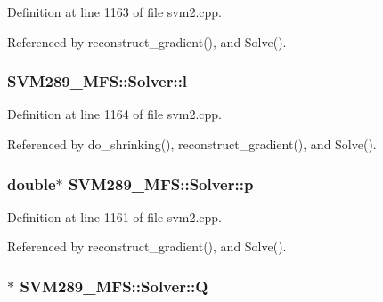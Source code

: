 Definition at line 1163 of file svm2.\+cpp.



Referenced by reconstruct\+\_\+gradient(), and Solve().

\subsubsection[{\texorpdfstring{l}{l}}]{ S\+V\+M289\+\_\+\+M\+F\+S\+::\+Solver\+::l\hspace{0.3cm}{\ttfamily [protected]}}\hypertarget{class_s_v_m289___m_f_s_1_1_solver_a3b58f02675a93b7f559946c731beebd5}{}\label{class_s_v_m289___m_f_s_1_1_solver_a3b58f02675a93b7f559946c731beebd5}


Definition at line 1164 of file svm2.\+cpp.



Referenced by do\+\_\+shrinking(), reconstruct\+\_\+gradient(), and Solve().

\subsubsection[{\texorpdfstring{p}{p}}]{\setlength{\rightskip}{0pt plus 5cm}double$\ast$ S\+V\+M289\+\_\+\+M\+F\+S\+::\+Solver\+::p\hspace{0.3cm}{\ttfamily [protected]}}\hypertarget{class_s_v_m289___m_f_s_1_1_solver_aee0ff21847e331b59d7a929b3c813b94}{}\label{class_s_v_m289___m_f_s_1_1_solver_aee0ff21847e331b59d7a929b3c813b94}


Definition at line 1161 of file svm2.\+cpp.



Referenced by reconstruct\+\_\+gradient(), and Solve().

\subsubsection[{\texorpdfstring{Q}{Q}}]{$\ast$ S\+V\+M289\+\_\+\+M\+F\+S\+::\+Solver\+::Q\hspace{0.3cm}{\ttfamily [protected]}}\hypertarget{class_s_v_m289___m_f_s_1_1_solver_a5655aaf1c92b609e8ed2087e08b053eb}{}\label{class_s_v_m289___m_f_s_1_1_solver_a5655aaf1c92b609e8ed2087e08b053eb}


